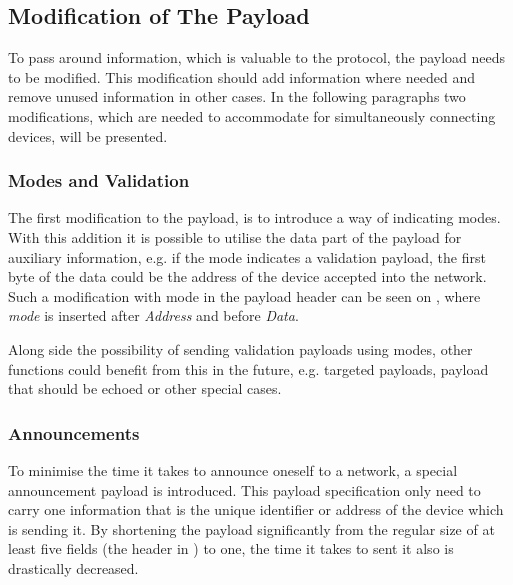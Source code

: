 \subsection{Modification of The Payload} %
\label{sub:modification_of_the_payload}
To pass around information, which is valuable to the protocol, the payload needs to be modified.
This modification should add information where needed and remove unused information in other cases.
In the following paragraphs two modifications, which are needed to accommodate for simultaneously connecting devices, will be presented. 

\subsubsection{Modes and Validation} %
\label{ssub:modes_and_validation}
The first modification to the payload, is to introduce a way of indicating modes.
With this addition it is possible to utilise the data part of the payload for auxiliary information, e.g. if the mode indicates a validation payload, the first byte of the data could be the address of the device accepted into the network.
Such a modification with mode in the payload header can be seen on , where \emph{mode} is inserted after \emph{Address} and before \emph{Data}. 


\noindent
Along side the possibility of sending validation payloads using modes, other functions could benefit from this in the future, e.g. targeted payloads, payload that should be echoed or other special cases.

\subsubsection{Announcements} %
\label{ssub:announcements}
To minimise the time it takes to announce oneself to a network, a special announcement payload is introduced.
This payload specification only need to carry one information that is the unique identifier or address of the device which is sending it.
By shortening the payload significantly from the regular size of at least five fields (the header in ) to one, the time it takes to sent it also is drastically decreased.


